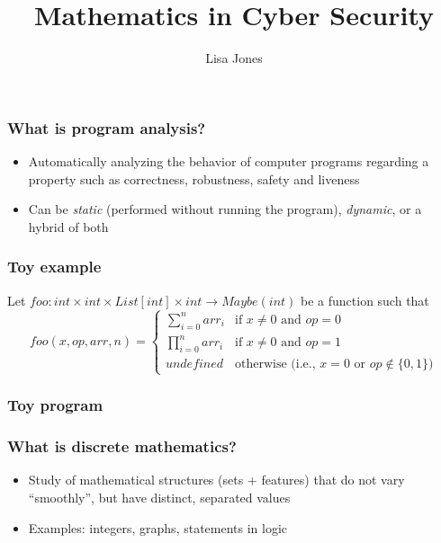\documentclass[11pt,table]{beamer}
\begin{document}
\author{Lisa Jones}
\title{Mathematics in Cyber Security}
\frame[plain]{\maketitle}


\begin{frame}
\frametitle{What is program analysis?}
  \begin{itemize}
  \item{ Automatically analyzing the behavior of computer programs regarding a property such as correctness, robustness, safety and liveness}
    \medskip
  \item{Can be \textit{static} (performed without running the program), \textit{dynamic}, or a hybrid of both}
      \end{itemize}
  \end{frame}

\begin{frame}
  \frametitle{Toy example}

  Let $ foo: int \times int \times List[int] \times int \to Maybe(int) $
  be a function such that
  \[
  foo(x, op, arr, n) = \begin{cases}
    \sum_{i=0}^{n} arr_i & \mbox{if } x \neq 0 \mbox{ and } op=0 \\
    \prod_{i=0}^{n} arr_i & \mbox{if } x \neq 0 \mbox{ and } op=1 \\
    undefined & \mbox{otherwise (i.e., } x=0 \mbox{ or } op \not\in \{0, 1\})
  \end{cases}
  \]
  
  \end{frame}

\begin{frame}[fragile]
  \frametitle{Toy program}
  
  \end{frame}


\begin{frame}
\frametitle{What is discrete mathematics?}
  \begin{itemize}
  \item{Study of mathematical structures (sets + features) that do not vary ``smoothly'', but have distinct, separated values}
    \medskip
  \item{Examples: integers, graphs, statements in logic}
  \end{itemize}
\end{frame}
\end{document}
